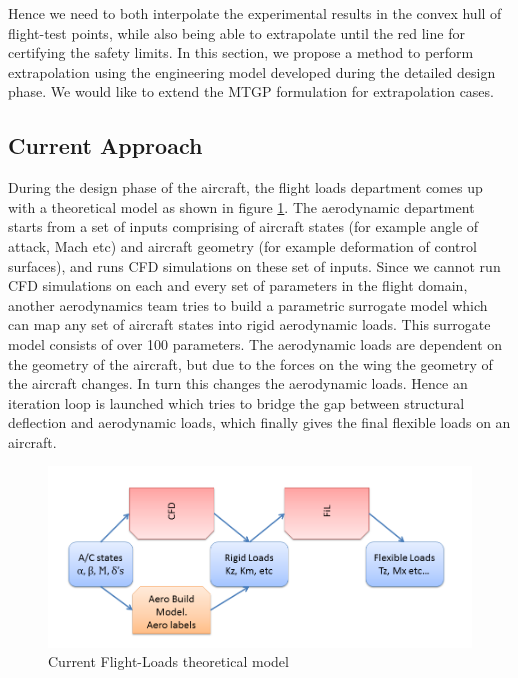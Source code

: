 Hence we need to both interpolate the experimental results in the convex hull of flight-test points, while also being able to extrapolate until the red line for certifying the safety limits. In this section, we propose a method to perform extrapolation using the engineering model developed during the detailed design phase. We would like to extend the MTGP formulation for extrapolation cases. 

\subsection{Current Approach}
During the design phase of the aircraft, the flight loads department comes up with a theoretical model as shown in figure \ref{fig:currentFlightLoadsIdentificationApproach}. The aerodynamic department starts from a set of inputs comprising of aircraft states (for example angle of attack, Mach etc) and aircraft geometry (for example deformation of control surfaces), and runs CFD simulations on these set of inputs. Since we cannot run CFD simulations on each and every set of parameters in the flight domain, another aerodynamics team tries to build a parametric surrogate model which can map any set of aircraft states into rigid aerodynamic loads. This surrogate model consists of over 100 parameters. The aerodynamic loads are dependent on the geometry of the aircraft, but due to the forces on the wing the geometry of the aircraft changes. In turn this changes the aerodynamic loads. Hence an iteration loop is launched which tries to bridge the gap between structural deflection and aerodynamic loads, which finally gives the final flexible loads on an aircraft. 

\begin{figure}[ht!]
 \centering
 \includegraphics[width=\textwidth]{images/part3/currentFlightLoadsIdentificationApproach}
 \caption{Current Flight-Loads theoretical model}
 \label{fig:currentFlightLoadsIdentificationApproach}
\end{figure}

